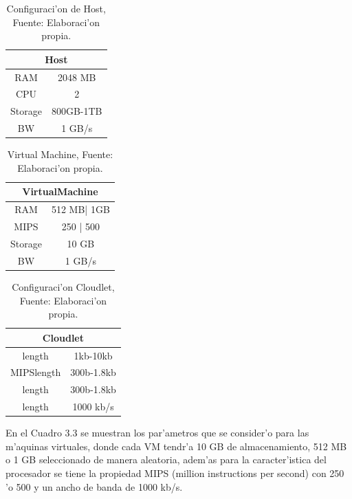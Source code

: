\begin{table}[!hbt]
	\centering
	\caption{Configuraci'on de Host, Fuente: Elaboraci'on propia.}
	\label{my-label}
	\begin{tabular}{@{}cc@{}}
		\toprule
		\multicolumn{2}{c}{{\bf Host}} \\ \midrule
		RAM           & 2048 MB        \\
		CPU           & 2              \\
		Storage       & 800GB-1TB      \\ \midrule
		BW            & 1 GB/s        
	\end{tabular}
\end{table}

 
\begin{table}[!hbt]
	\centering
	\caption{Virtual Machine, Fuente: Elaboraci'on propia.}
	\label{my-label}
	\begin{tabular}{@{}cc@{}}
		\toprule
		\multicolumn{2}{c}{{\bf VirtualMachine}} \\ \midrule
		RAM               & 512 MB| 1GB          \\
		MIPS              & 250 | 500            \\
		Storage           & 10 GB                \\ \midrule
		BW                & 1 GB/s              
	\end{tabular}
\end{table}


\begin{table}[!hbt]
	\centering
	\caption{Configuraci'on Cloudlet, Fuente: Elaboraci'on propia.}
	\label{my-label}
	\begin{tabular}{@{}cc@{}}
		\toprule
		\multicolumn{2}{c}{{\bf Cloudlet}} \\ \midrule
		length           & 1kb-10kb        \\
		MIPSlength       & 300b-1.8kb      \\
		length           & 300b-1.8kb      \\ \midrule
		length           & 1000 kb/s      
	\end{tabular}
\end{table}


En el Cuadro 3.3 se muestran los par'ametros que se consider'o para las m'aquinas virtuales, donde cada VM tendr'a 10 GB de almacenamiento, 512 MB  o 1 GB seleccionado de manera aleatoria, adem'as para la caracter'istica del procesador se tiene  la propiedad MIPS (million instructions per second) con 250 'o 500 y un ancho de banda de 1000 kb/s.

